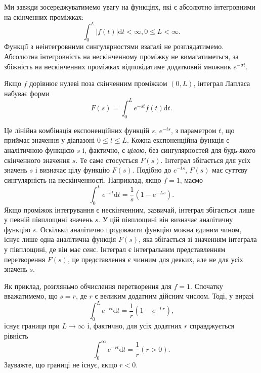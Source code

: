 \documentclass[14pt,twoside]{extreport}
\theoremstyle{mystyle}
\numberwithin{equation}{chapter}
\begin{document}
Ми завжди зосереджуватимемо увагу на функціях, які є абсолютно інтегровними на скінченних проміжках:
\begin{equation*}
	\displaystyle \int_{0}^{L}|f(t)|\mathrm{d}t<\infty, 0\leqslant L<\infty.
\end{equation*}
Функції з неінтегровними сингулярностями взагалі не розглядатимемо. Абсолютна інтегровність на нескінченному проміжку не вимагатиметься, за збіжність на нескінченних проміжках відповідатиме додатковий множник $e^{-\sigma t}$.

Якщо $f$ дорівнює нулеві поза скінченним проміжком $(0, L)$, інтеграл Лапласа набуває форми
\begin{equation*}
	\displaystyle F(s)=\int_{0}^{L}e^{-st}f(t)\mathrm{d}t.
\end{equation*}

Це лінійна комбінація експоненційних функцій $s$, $e^{-ts}$, з параметром $t$, що приймає значення у діапазоні $0\leqslant t\leqslant L$. Кожна експоненційна функція є аналітичною функцією $s$ і, фактично, є \emph{цілою}, без сингулярностей для будь-якого скінченного значення $s$. Те саме стосується $F(s)$. Інтеграл збігається для усіх значень $s$ і визначає цілу функцію $F(s)$. Подібно до $e^{-ts}$, $F(s)$ має суттєву сингулярність на нескінченності. Наприклад, якщо $f=1$, маємо
\begin{equation*}
	\displaystyle \int_{0}^{L}e^{-st}\mathrm{d}t=\dfrac{1}{s}(1-e^{-Ls}).
\end{equation*}
Якщо проміжок інтегрування є нескінченним, зазвичай, інтеграл збігається лише у певній півплощині значень $s$. У цій півплощині він визначає аналітичну функцію $s$. Оскільки аналітично продовжити функцію можна єдиним чином, існує лише одна аналітична функція $F(s)$, яка збігається зі значенням інтеграла у півплощині, де він має сенс. Інтеграл є інтегральним представленням перетворення $F(s)$, це представлення є чинним для деяких, але не для усіх значень $s$.

Як приклад, розгляньмо обчислення перетворення для $f=1$. Спочатку вважатимемо, що $s=r$, де $r$ є великим додатним дійсним числом. Тоді, у виразі
\begin{equation*}
	\displaystyle \int_{0}^{L}e^{-rt}\mathrm{d}t=\dfrac{1}{r}(1-e^{-Lr}),
\end{equation*}
існує границя при $ L\to \infty$ і, фактично, для усіх додатних $r$ справджується рівність
\begin{equation*}
	\displaystyle \int_{0}^{\infty}e^{-rt}\mathrm{d}t=\dfrac{1}{r} (r>0).
\end{equation*}
Зауважте, що границі не існує, якщо $r<0$.
\end{document}
